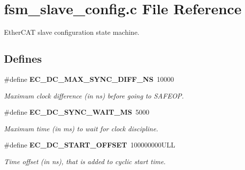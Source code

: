 \section{fsm\-\_\-slave\-\_\-config.\-c \-File \-Reference}
\label{fsm__slave__config_8c}


\-Ether\-C\-A\-T slave configuration state machine.  


\subsection*{\-Defines}
\begin{DoxyCompactItemize}
\item 
\#define {\bf \-E\-C\-\_\-\-D\-C\-\_\-\-M\-A\-X\-\_\-\-S\-Y\-N\-C\-\_\-\-D\-I\-F\-F\-\_\-\-N\-S}~10000
\begin{DoxyCompactList}\small\item\em \-Maximum clock difference (in ns) before going to \-S\-A\-F\-E\-O\-P. \end{DoxyCompactList}\item 
\#define {\bf \-E\-C\-\_\-\-D\-C\-\_\-\-S\-Y\-N\-C\-\_\-\-W\-A\-I\-T\-\_\-\-M\-S}~5000\label{fsm__slave__config_8c_aa507b566eace93ee237a040d67a90430}

\begin{DoxyCompactList}\small\item\em \-Maximum time (in ms) to wait for clock discipline. \end{DoxyCompactList}\item 
\#define {\bf \-E\-C\-\_\-\-D\-C\-\_\-\-S\-T\-A\-R\-T\-\_\-\-O\-F\-F\-S\-E\-T}~100000000\-U\-L\-L\label{fsm__slave__config_8c_ae3ebe26a0aba621a2fa21a8c216ef4bb}

\begin{DoxyCompactList}\small\item\em \-Time offset (in ns), that is added to cyclic start time. \end{DoxyCompactList}\end{DoxyCompactItemize}
